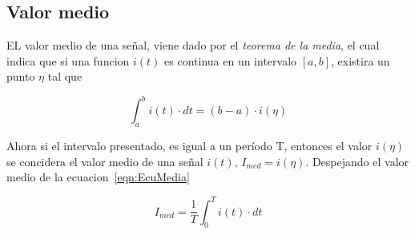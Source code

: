 \subsection{Valor medio}
    EL valor medio de una señal, viene dado por el 
    \textit{teorema de la media}, el cual indica que si una funcion $i(t)$
    es continua en un intervalo $[a,b]$, existira un punto \(\eta\) tal que
    
        \begin{equation}
            \int_{a}^{b} i(t) \cdot dt = (b-a)\cdot i(\eta) \label{eqn:EcuMedia}
        \end{equation}

    \noindent Ahora si el intervalo presentado, es igual a un período T, entonces 
    el valor \(i(\eta)\) se concidera el valor medio de una señal \(i(t)\), \(I_{med} = i(\eta)\).
    Despejando el valor medio de la ecuacion~\ref{eqn:EcuMedia}

        \begin{equation*}
            I_{med}= \dfrac{1}{T}\int_{0}^{T} i(t)\cdot dt
        \end{equation*}
